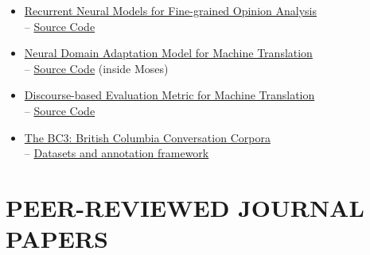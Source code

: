 \documentclass[paper=letter,fontsize=11pt]{scrartcl} %
\newcommand{\NewPart}[2]{\section*{\uppercase{#1} #2}}
\begin{document}
\begin{itemize}
\item \href{https://github.com/ppfliu/opinion-target}{Recurrent Neural Models for Fine-grained Opinion Analysis}\\ {-- \href{https://github.com/ppfliu/opinion-target} {Source Code}}





\item \href{https://github.com/Qatar-Computing-Research-Institute/mosesdecoder}{Neural Domain Adaptation Model for Machine Translation}\\ {-- \href{https://github.com/Qatar-Computing-Research-Institute/mosesdecoder} {Source Code} (inside Moses)}



\item \href{https://github.com/Qatar-Computing-Research-Institute}{Discourse-based Evaluation Metric for Machine Translation}\\ {-- \href{https://github.com/Qatar-Computing-Research-Institute} {Source Code}}


\item \href{https://www.cs.ubc.ca/cs-research/lci/research-groups/natural-language-processing/bc3.html}{The BC3: British Columbia Conversation Corpora}\\ {-- \href{https://www.cs.ubc.ca/cs-research/lci/research-groups/natural-language-processing/bc3.html} {Datasets and annotation framework}}

\end{itemize}








\vspace{1cm}
\NewPart{Peer-Reviewed Journal Papers}{}
\end{document}
